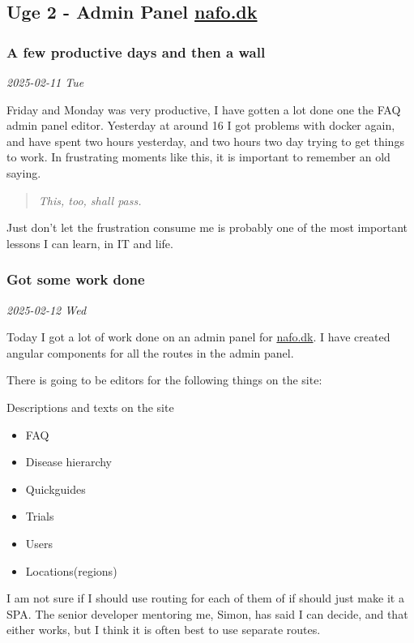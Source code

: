 \documentclass[../main.tex]{subfiles}
\begin{document}
\subsection{Uge 2 - Admin Panel \href{https://www.nationaltforsoegsoverblik.dk/}{nafo.dk}}
\subsubsection{\textbf{A few productive days and then a wall}}

\textit{2025-02-11 Tue}

Friday and Monday was very productive, I have gotten a lot done one the FAQ admin panel editor. Yesterday at around 16 I got problems with docker again, and have spent two hours yesterday, and two hours two day trying to get things to work. In frustrating moments like this, it is important to remember an old saying.

\begin{quote}
\emph{This, too, shall pass.}
\end{quote}

Just don't let the frustration consume me is probably one of the most important lessons I can learn, in IT and life.

\subsubsection{\textbf{Got some work done}}

\textit{2025-02-12 Wed}

Today I got a lot of work done on an admin panel for \href{https://www.nationaltforsoegsoverblik.dk/}{nafo.dk}. I have created angular components for all the routes in the admin panel.

There is going to be editors for the following things on the site:

Descriptions and texts on the site

\begin{itemize}
\item
  FAQ
\item
  Disease hierarchy
\item
  Quickguides
\item
  Trials
\item
  Users
\item
  Locations(regions)
\end{itemize}

I am not sure if I should use routing for each of them of if should just make it a SPA. The senior developer mentoring me, Simon, has said I can decide, and that either works, but I think it is often best to use separate routes.
\end{document}

